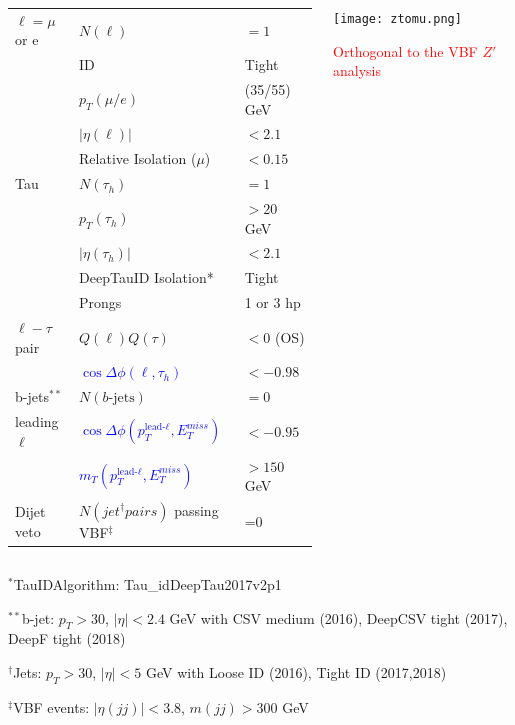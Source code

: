 \documentclass[8pt,xcolor=dvipsnames,xcolor=table]{beamer}
\begin{document}
\begin{frame}
\begin{columns}
\begin{column}{.6\textwidth}
{\begin{tabular}{lll}
$\ell = \mu $ or e & $N(\ell)$ 			& $= 1$  \\
& ID                            & Tight \\
& $p_T(\mu/e)$			& (35/55) GeV  \\
& $|\eta(\ell)|$ 		& $<2.1$   \\
& Relative Isolation ($\mu$) 	& $<0.15$ \\
\hline 
Tau & $N(\tau_h)$ 			& $= 1$  \\
& $p_T(\tau_h)$			& $>20$ GeV   \\
& $|\eta(\tau_h)|$ 	& $<2.1$   \\
& DeepTauID Isolation* 			& Tight \\
& Prongs 			& 1 or 3 hp \\
\hline
$\ell-\tau$ pair & $Q(\ell)Q(\tau)$ 	& $<0$ (OS)  	\\
& \textcolor{blue}{$\cos\Delta\phi(\ell,\tau_h)$} &$<-0.98$ \\
\hline
b-jets$^{**}$ & $N(b\text{-jets})$ & $=0$\\
\hline
leading $\ell$ & \textcolor{blue}{ $\cos\Delta\phi(p_T^{\text{lead-}\ell},E_T^{miss})$} & $<-0.95$ \\
&\textcolor{blue}{ $m_T(p_T^{\text{lead-}\ell},E_T^{miss})$} & $>150$ GeV \\
\hline
Dijet veto & $N(jet^{\dagger} pairs)$ passing VBF$^{\ddag}$ & =0 \\
\hline  
\end{tabular}
}
    \end{column}
    \begin{column}{.45\textwidth}
\texttt{[image: ztomu.png]}

\textcolor{red}{Orthogonal to the VBF $Z'$ analysis}
    \end{column}
\end{columns}
 \medskip
\footnotesize
$^{*}$TauIDAlgorithm: Tau\_idDeepTau2017v2p1

$^{**}$b-jet: $p_T>30$, $|\eta|<2.4$ GeV with CSV medium (2016), DeepCSV tight (2017), DeepF tight (2018)

$^{\dagger}$Jets: $p_T>30$, $|\eta|<5$ GeV with Loose ID (2016), Tight ID (2017,2018)

$^{\ddag}$VBF events: $|\eta(jj)|<3.8$, $m(jj)>300$ GeV

\end{frame}
\end{document}

